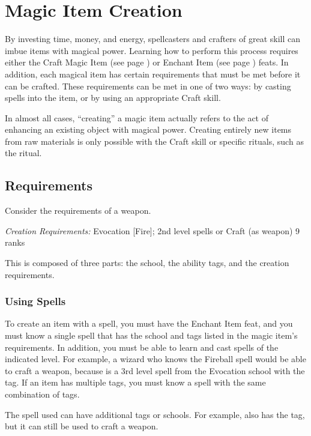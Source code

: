 \section{Magic Item Creation}\label{Magic Item Creation}\label{Creating Magic Items}

    By investing time, money, and energy, spellcasters and crafters of great skill can imbue items with magical power. Learning how to perform this process requires either the Craft Magic Item (see page ) or Enchant Item (see page ) feats. In addition, each magical item has certain requirements that must be met before it can be crafted. These requirements can be met in one of two ways: by casting spells into the item, or by using an appropriate Craft skill.

    In almost all cases, ``creating'' a magic item actually refers to the act of enhancing an existing object with magical power.
    Creating entirely new items from raw materials is only possible with the Craft skill or specific rituals, such as the  ritual.

\subsection{Requirements}
Consider the requirements of a  weapon.

\textit{Creation Requirements:} Evocation [Fire]; 2nd level spells or Craft (as weapon) 9 ranks

This is composed of three parts: the school, the ability tags, and the creation requirements.

\subsubsection{Using Spells}
    To create an item with a spell, you must have the Enchant Item feat, and you must know a single spell that has the school and tags listed in the magic item's requirements. In addition, you must be able to learn and cast spells of the indicated level. For example, a wizard who knows the Fireball spell would be able to craft a  weapon, because  is a 3rd level spell from the Evocation school with the  tag. If an item has multiple tags, you must know a spell with the same combination of tags.
    
    The spell used can have additional tags or schools. For example,  also has the  tag, but it can still be used to craft a  weapon.

